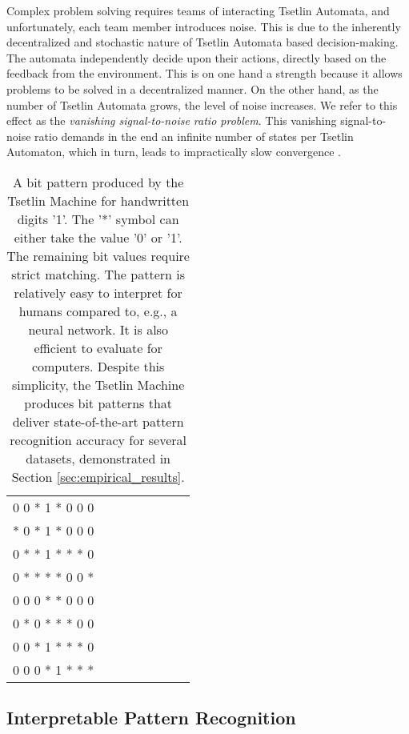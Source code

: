 \documentclass[11pt,a4paper]{article}
\begin{document}
Complex problem solving requires teams of interacting Tsetlin Automata, and unfortunately, each team member introduces noise. This is due to the inherently decentralized and stochastic nature of Tsetlin Automata based decision-making. The automata independently decide upon their actions, directly based on the feedback from the environment. This is on one hand a strength because it allows problems to be solved in a decentralized manner. On the other hand, as the number of Tsetlin Automata grows, the level of noise increases. We refer to this effect as the \emph{vanishing signal-to-noise ratio problem}. This vanishing signal-to-noise ratio demands in the end an infinite number of states per Tsetlin Automaton, which in turn, leads to impractically slow convergence \cite{Narendra1989,Tung1996}.

\begin{table}[!bh]
    \centering
    \begin{tabular}{cccccccc}
            0 0 * 1 * 0 0 0\\
            * 0 * 1 * 0 0 0\\
            0 * * 1 * * * 0\\
            0 * * * * 0 0 *\\
            0 0 0 * * 0 0 0\\
            0 * 0 * * * 0 0\\
            0 0 * 1 * * * 0\\
            0 0 0 * 1 * * *\\
    \end{tabular}
    \caption{A bit pattern produced by the Tsetlin Machine for handwritten digits '1'. The '*' symbol can either take the value '0' or '1'. The remaining bit values require strict matching. The pattern is relatively easy to interpret for humans compared to, e.g., a neural network. It is also efficient to evaluate for computers. Despite this simplicity, the Tsetlin Machine produces bit patterns that deliver state-of-the-art pattern recognition accuracy for several datasets, demonstrated in Section \ref{sec:empirical_results}.}
    \label{tab:bit_pattern}
\end{table}

\subsection{Interpretable Pattern Recognition}
\end{document}
